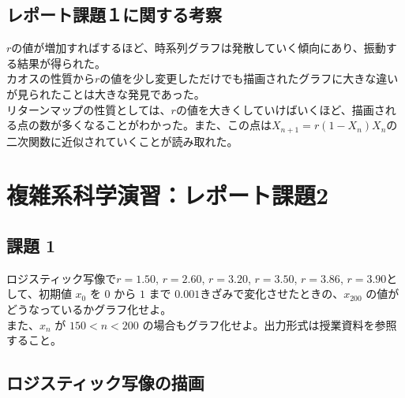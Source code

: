 \documentclass[dvipdfmx,uplatex]{jsarticle}
\begin{document}
\subsection{レポート課題１に関する考察}
$r$の値が増加すればするほど、時系列グラフは発散していく傾向にあり、振動する結果が得られた。\\
カオスの性質から$r$の値を少し変更しただけでも描画されたグラフに大きな違いが見られたことは大きな発見であった。\\
リターンマップの性質としては、$r$の値を大きくしていけばいくほど、描画される点の数が多くなることがわかった。また、この点は$X_{n+1} = r(1 - X_n)X_n$の二次関数に近似されていくことが読み取れた。

\newpage

\section{複雑系科学演習：レポート課題2}

\subsection{課題 1}
  ロジスティック写像で$r = 1.50$, $r = 2.60$, $r = 3.20$, $r = 3.50$, $r = 3.86$, $r = 3.90$として、初期値 $x_{0}$ を $0$ から $1$ まで $0.001$きざみで変化させたときの、$x_{200}$ の値がどうなっているかグラフ化せよ。\\
また、$x_{n}$ が $150 < n < 200$ の場合もグラフ化せよ。出力形式は授業資料を参照すること。

\subsection{ロジスティック写像の描画}
\end{document}
